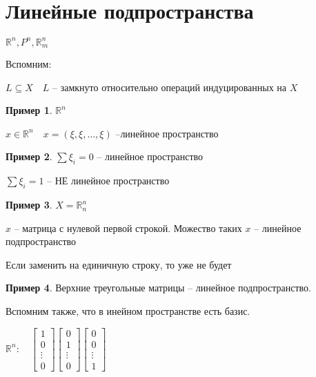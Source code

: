 \documentclass{book}
\newcommand\R{\ensuremath{\mathbb{R}}}
\theoremstyle{definition}
\newtheorem*{example}{Пример}
\begin{document}
\section{Линейные подпространства}

$\R^n, P^n, \R^n_m$

Вспомним:
\begin{definition}
    $L\subseteq X\quad L$ -- замкнуто относительно операций индуцированных на $X$
\end{definition}

\begin{example}
    $\R^n$ 

    $x\in \R^n\quad x = \left( \xi, \xi, \ldots, \xi \right) $ --линейное пространство
\end{example}

\begin{example}
    $\sum \xi_i = 0$ -- линейное пространство

     $\sum \xi_i = 1$ -- НЕ линейное пространство
\end{example}

\begin{example}
    $X = \R_n^n$

    $x$ -- матрица с нулевой первой строкой. Можество таких  $x$ -- линейное подпространство

    Если заменить на единичную строку, то уже не будет
\end{example}

\begin{example}
    Верхние треугольные матрицы -- линейное подпространство.
\end{example}

Вспомним также, что в инейном пространстве есть базис.

$\R^n:\quad \begin{bmatrix} 1\\0\\ \vdots \\0 \end{bmatrix} \begin{bmatrix} 0 \\ 1 \\ \vdots \\ 0 \end{bmatrix} \begin{bmatrix} 0\\0\\ \vdots \\ 1 \end{bmatrix} $
\end{document}

